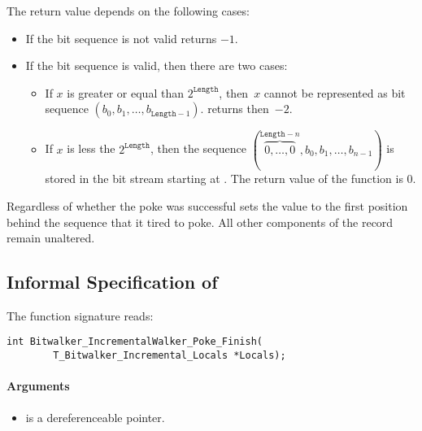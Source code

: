 The return value depends on  the following cases:
\begin{itemize}
    \item  If the bit sequence is not valid \peeknext  returns $-1$.
    \item  If the bit sequence is valid, then there are two cases:
\begin{itemize}
\item
If $x$ is greater or equal than $2^\mathtt{Length}$, then~$x$
cannot be represented as bit sequence $(b_0, b_1,\ldots,b_{\mathtt{Length} - 1})$.
\pokenext returns then~$-2$.

\item
If $x$ is less the $2^{\mathtt{Length}}$, then  the sequence
$(\overbrace{0,\ldots,0}^{\mathtt{Length}-n},b_0, b_1,\ldots,b_{n - 1})$
is stored in the bit stream starting at .
The return value of the function \pokenext is 0.

\end{itemize}
\end{itemize}

Regardless of whether the poke was successful \pokenext sets the value   to the first position behind the sequence that it tired to poke.
 All other components of the record  remain unaltered.



\clearpage

\subsection{Informal Specification of }

 The function signature reads:\\[1em]

\begin{lstlisting}[style=acsl-block]
int Bitwalker_IncrementalWalker_Poke_Finish(
        T_Bitwalker_Incremental_Locals *Locals);
\end{lstlisting}

\paragraph{Arguments}
\begin{itemize}
   \item  {} is a dereferenceable pointer.
\end{itemize}

